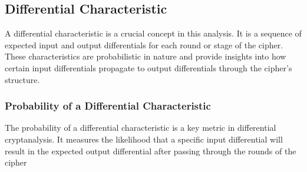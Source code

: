 \subsection{Differential Characteristic}

A differential characteristic is a crucial concept in this analysis. It is a sequence of expected input and output differentials for each round or stage of the cipher. These characteristics are probabilistic in nature and provide insights into how certain input differentials propagate to output differentials through the cipher's structure.

\subsubsection{Probability of a Differential Characteristic}
The probability of a differential characteristic is a key metric in differential cryptanalysis. It measures the likelihood that a specific input differential will result in the expected output differential after passing through the rounds of the cipher

